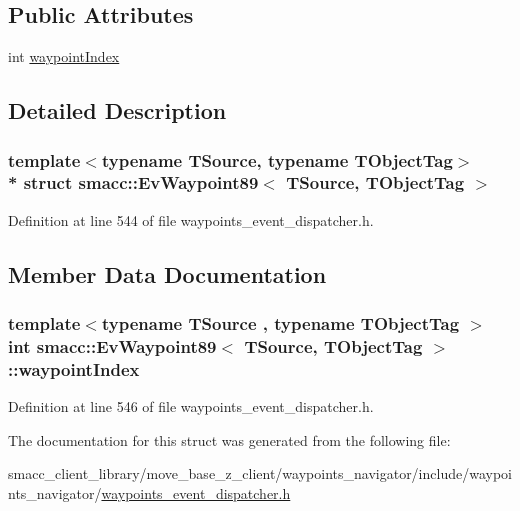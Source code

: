 \subsection*{Public Attributes}
\begin{DoxyCompactItemize}
\item 
int \hyperlink{structsmacc_1_1EvWaypoint89_a85ddc7eb6967f73d012fb31453936468}{waypoint\+Index}
\end{DoxyCompactItemize}


\subsection{Detailed Description}
\subsubsection*{template$<$typename T\+Source, typename T\+Object\+Tag$>$\\*
struct smacc\+::\+Ev\+Waypoint89$<$ T\+Source, T\+Object\+Tag $>$}



Definition at line 544 of file waypoints\+\_\+event\+\_\+dispatcher.\+h.



\subsection{Member Data Documentation}
\subsubsection[{\texorpdfstring{waypoint\+Index}{waypointIndex}}]{\setlength{\rightskip}{0pt plus 5cm}template$<$typename T\+Source , typename T\+Object\+Tag $>$ int {\bf smacc\+::\+Ev\+Waypoint89}$<$ T\+Source, T\+Object\+Tag $>$\+::waypoint\+Index}\hypertarget{structsmacc_1_1EvWaypoint89_a85ddc7eb6967f73d012fb31453936468}{}\label{structsmacc_1_1EvWaypoint89_a85ddc7eb6967f73d012fb31453936468}


Definition at line 546 of file waypoints\+\_\+event\+\_\+dispatcher.\+h.



The documentation for this struct was generated from the following file\+:\begin{DoxyCompactItemize}
\item 
smacc\+\_\+client\+\_\+library/move\+\_\+base\+\_\+z\+\_\+client/waypoints\+\_\+navigator/include/waypoints\+\_\+navigator/\hyperlink{waypoints__event__dispatcher_8h}{waypoints\+\_\+event\+\_\+dispatcher.\+h}\end{DoxyCompactItemize}

